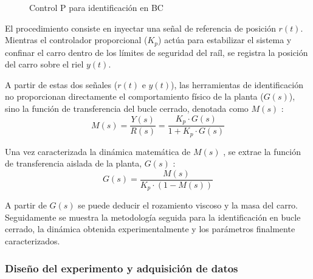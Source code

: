 \documentclass[11pt,fleqn]{book} %
\begin{document}
\begin{figure}[ht]
	\centering
	\resizebox{\textwidth}{!}{%
		
	}
	\caption{Control P para identificación en BC}
	\label{fig:ident_BC}
\end{figure} 

El procedimiento consiste en inyectar una señal de referencia de posición $r(t)$. Mientras el controlador proporcional ($K_p$) actúa para estabilizar el sistema y confinar el carro dentro de los límites de seguridad del raíl, se registra la posición del carro sobre el riel $y(t)$. 

A partir de estas dos señales ($r(t)$ e $y(t)$), las herramientas de identificación no proporcionan directamente el comportamiento físico de la planta ($G(s)$), sino la función de transferencia del bucle cerrado, denotada como $M(s)$ \cite{Penarrocha_Tema1}:
\begin{equation}
	M(s) = \frac{Y(s)}{R(s)} = \frac{K_p \cdot G(s)}{1 + K_p \cdot G(s)}
\end{equation}

Una vez caracterizada la dinámica matemática de $M(s)$ , se extrae la función de transferencia aislada de la planta, $G(s)$ \cite{Penarrocha_Tema1}:
\begin{equation}
	G(s) = \frac{M(s)}{K_p \cdot (1 - M(s))}
	\label{eq:despeja_g}
\end{equation}

A partir de $G(s)$ se puede deducir el rozamiento viscoso y la masa del carro. Seguidamente se muestra la metodología seguida para la identificación en bucle cerrado, la dinámica obtenida experimentalmente y los parámetros finalmente caracterizados. 

\newpage
\subsubsection{Diseño del experimento y adquisición de datos}
\end{document}
